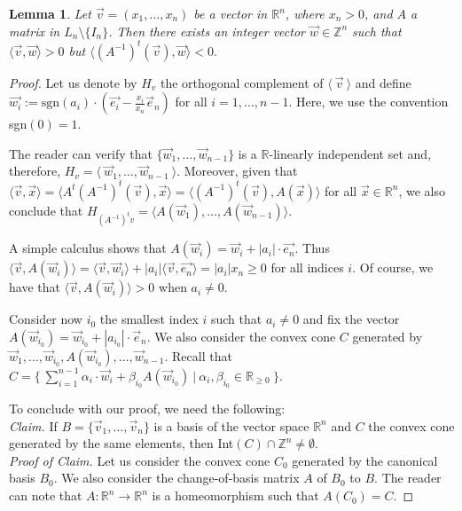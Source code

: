 \documentclass[12pt]{article}
\newtheorem{lem}{Lemma}
\theoremstyle{definition}
\begin{document}
\begin{lem}
\label{lemacono}
    Let $\vec{v}=(x_1,\dots,x_n)$ be a vector in $\mathbb{R}^n$, where $x_n>0$, and $A$ a matrix in $L_n\setminus\{I_n\}$.
    Then there exists an integer vector $\vec{w}\in \mathbb{Z}^n$ such that $\langle \vec{v} , \vec{w} \rangle>0$ but $\langle (A^{-1})^t(\vec{v}) , \vec{w} \rangle<0.$
\end{lem}
\begin{proof}
Let us denote by $H_{v}$ the orthogonal complement of $\langle\ \vec{v}\ \rangle$ and define $\vec{w_i}:= \text{sgn}(a_i)\cdot(\vec{e_i}-\frac{x_i}{x_n}\vec{e}_n)$ for all $i=1,\dots,n-1$. 
Here, we use the convention sgn$(0)=1$. 

The reader can verify that $\{\vec{w}_1,\dots, \vec{w}_{n-1}\}$ is a $\mathbb{R}$-linearly independent set and, therefore, $H_v=\langle\ \vec{w}_1,\dots, \vec{w}_{n-1}\ \rangle$.
Moreover, given that $\langle\vec{v},\vec{x}\rangle=\langle A^t(A^{-1})^t(\vec{v}),\vec{x}\rangle =\langle (A^{-1})^t(\vec{v}),A(\vec{x})\rangle$ for all $\vec{x}\in \mathbb{R}^n$, we also conclude that $H_{(A^{-1})^tv}=\langle A(\vec{w}_1),\dots, A(\vec{w}_{n-1})\rangle.$

A simple calculus shows that $A(\vec{w}_i)=\vec{w}_i+|a_i|\cdot \vec{e_n}$. Thus $\langle \vec{v},A(\vec{w}_i)\rangle=\langle\vec{v},\vec{w}_i\rangle +|a_i|\langle \vec{v},\vec{e_n}\rangle=|a_i|x_n\geq 0$ for all indices $i$.
Of course, we have that $\langle\vec{v},A(\vec{w}_i)\rangle>0$ when $a_i\neq 0.$

Consider now $i_0$ the smallest index $i$ such that $a_i\neq 0$ and fix the vector $A(\vec{w}_{i_0})=\vec{w}_{i_0}+|a_{i_0}|\cdot\vec{e}_n$. We also consider the convex cone $C$ generated by $\vec{w}_1,\dots, \vec{w}_{i_0},A(\vec{w}_{i_0}),\dots, \vec{w}_{n-1}$. Recall that $C=\{\ \sum_{i=1}^{n-1}\alpha_i\cdot\vec{w}_i  + \beta_{i_0}A(\vec{w}_{i_0})\ |\ \alpha_{i},\beta_{i_0}\in \mathbb{R}_{\geq 0}\ \}$.

 To conclude with our proof, we need the following:\\ 

    \noindent\textit{Claim.} If $B=\{\vec{v}_1,\dots, \vec{v}_n\}$ is a basis of the vector space $\mathbb{R}^n$ and $C$ the convex cone generated by the same elements, then Int$(C)\cap \mathbb{Z}^n\neq \emptyset$.\\

    \noindent\textit{Proof of Claim.} Let us consider the convex cone $C_0$ generated by the canonical basis $B_0$. We also consider the change-of-basis matrix $A$ of $B_0$ to $B$. The reader can note that $A: \mathbb{R}^n\rightarrow \mathbb{R}^n$ is a homeomorphism such that $A(C_0)=C$. 
    

\end{proof}
\end{document}
